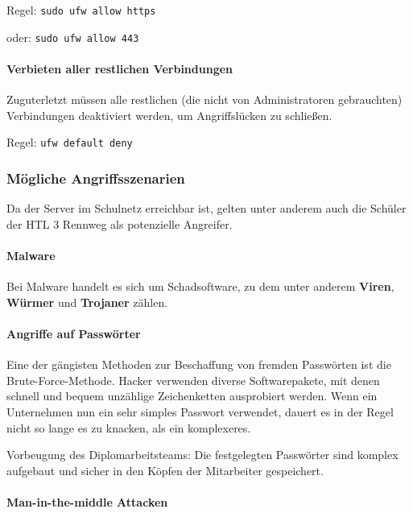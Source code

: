 \documentclass[
]{article}
\begin{document}
Regel: \texttt{sudo\ ufw\ allow\ https}

oder: \texttt{sudo\ ufw\ allow\ 443}

\hypertarget{verbieten-aller-restlichen-verbindungen}{%
\paragraph{Verbieten aller restlichen
Verbindungen}\label{verbieten-aller-restlichen-verbindungen}}

Zuguterletzt müssen alle restlichen (die nicht von Administratoren
gebrauchten) Verbindungen deaktiviert werden, um Angriffslücken zu
schließen.

Regel: \texttt{ufw\ default\ deny}

\hypertarget{muxf6gliche-angriffsszenarien}{%
\subsubsection{Mögliche
Angriffsszenarien}\label{muxf6gliche-angriffsszenarien}}

Da der Server im Schulnetz erreichbar ist, gelten unter anderem auch die
Schüler der HTL 3 Rennweg als potenzielle Angreifer.

\hypertarget{malware}{%
\paragraph{Malware}\label{malware}}

Bei Malware handelt es sich um Schadsoftware, zu dem unter anderem
\textbf{Viren}, \textbf{Würmer} und \textbf{Trojaner} zählen.

\hypertarget{angriffe-auf-passwuxf6rter}{%
\paragraph{Angriffe auf Passwörter}\label{angriffe-auf-passwuxf6rter}}

Eine der gängisten Methoden zur Beschaffung von fremden Passwörten ist
die Brute-Force-Methode. Hacker verwenden diverse Softwarepakete, mit
denen schnell und bequem unzählige Zeichenketten ausprobiert werden.
Wenn ein Unternehmen nun ein sehr simples Passwort verwendet, dauert es
in der Regel nicht so lange es zu knacken, als ein komplexeres.

Vorbeugung des Diplomarbeitsteams: Die festgelegten Passwörter sind
komplex aufgebaut und sicher in den Köpfen der Mitarbeiter gespeichert.

\hypertarget{man-in-the-middle-attacken}{%
\paragraph{Man-in-the-middle
Attacken}\label{man-in-the-middle-attacken}}
\end{document}
